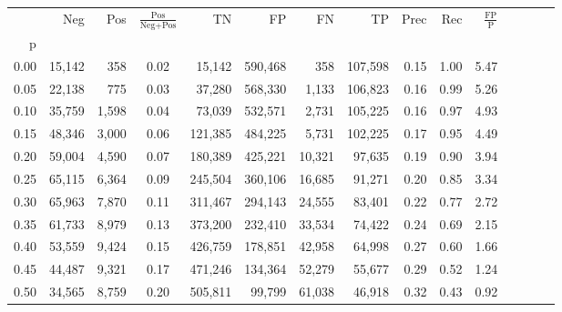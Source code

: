 \begin{tabular}{rrrcrrrrrrrrrrr}
\toprule
{} &     Neg &    Pos & $\frac{\text{Pos}}{\text{Neg}+\text{Pos}}$ &       TN &       FP &       FN &       TP &  Prec &   Rec & $\frac{\text{FP}}{\text{P}}$ \\
p    &         &        &                                            &          &          &          &          &       &       &                              \\
\midrule
0.00 &  15,142 &    358 &                                       0.02 &   15,142 &  590,468 &      358 &  107,598 &  0.15 &  1.00 &                         5.47 \\
0.05 &  22,138 &    775 &                                       0.03 &   37,280 &  568,330 &    1,133 &  106,823 &  0.16 &  0.99 &                         5.26 \\
0.10 &  35,759 &  1,598 &                                       0.04 &   73,039 &  532,571 &    2,731 &  105,225 &  0.16 &  0.97 &                         4.93 \\
0.15 &  48,346 &  3,000 &                                       0.06 &  121,385 &  484,225 &    5,731 &  102,225 &  0.17 &  0.95 &                         4.49 \\
0.20 &  59,004 &  4,590 &                                       0.07 &  180,389 &  425,221 &   10,321 &   97,635 &  0.19 &  0.90 &                         3.94 \\
0.25 &  65,115 &  6,364 &                                       0.09 &  245,504 &  360,106 &   16,685 &   91,271 &  0.20 &  0.85 &                         3.34 \\
0.30 &  65,963 &  7,870 &                                       0.11 &  311,467 &  294,143 &   24,555 &   83,401 &  0.22 &  0.77 &                         2.72 \\
0.35 &  61,733 &  8,979 &                                       0.13 &  373,200 &  232,410 &   33,534 &   74,422 &  0.24 &  0.69 &                         2.15 \\
0.40 &  53,559 &  9,424 &                                       0.15 &  426,759 &  178,851 &   42,958 &   64,998 &  0.27 &  0.60 &                         1.66 \\
0.45 &  44,487 &  9,321 &                                       0.17 &  471,246 &  134,364 &   52,279 &   55,677 &  0.29 &  0.52 &                         1.24 \\
0.50 &  34,565 &  8,759 &                                       0.20 &  505,811 &   99,799 &   61,038 &   46,918 &  0.32 &  0.43 &                         0.92 \\

\end{tabular}
